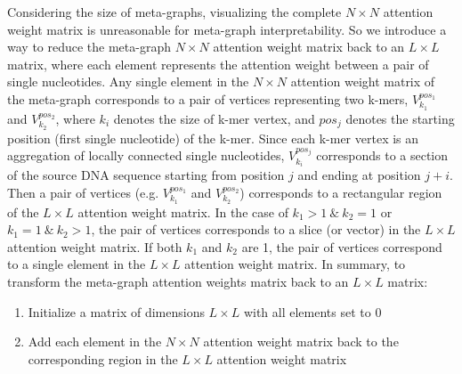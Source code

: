 \documentclass{article}
\begin{document}
Considering the size of meta-graphs, visualizing the complete $N\times N$ attention weight matrix is unreasonable for meta-graph interpretability. So we introduce a way to reduce the meta-graph $N\times N$ attention weight matrix back to an $L\times L$ matrix, where each element represents the attention weight between a pair of single nucleotides. Any single element in the $N\times N$ attention weight matrix of the meta-graph corresponds to a pair of vertices representing two k-mers, $V_{k_1}^{pos_1}$ and $V_{k_2}^{pos_2}$, where $k_i$ denotes the size of k-mer vertex, and $pos_j$ denotes the starting position (first single nucleotide) of the k-mer. Since each k-mer vertex is an aggregation of locally connected single nucleotides, $V_{k_i}^{pos_j}$ corresponds to a section of the source DNA sequence starting from position $j$ and ending at position $j+i$. Then a pair of vertices (e.g. $V_{k_1}^{pos_1}$ and $V_{k_2}^{pos_2}$) corresponds to a rectangular region of the $L\times L$ attention weight matrix. In the case of $k_1 > 1 \ \& \ k_2 = 1$ or $k_1 = 1 \ \& \ k_2 > 1$, the pair of vertices corresponds to a slice (or vector) in the $L\times L$ attention weight matrix. If both $k_1$ and $k_2$ are 1, the pair of vertices correspond to a single element in the $L\times L$ attention weight matrix. In summary, to transform the meta-graph attention weights matrix back to an $L\times L$ matrix:
\begin{enumerate}
\item Initialize a matrix of dimensions $L\times L$ with all elements set to 0
\item Add each element in the $N\times N$ attention weight matrix back to the corresponding region in the $L\times L$ attention weight matrix
\end{enumerate}


\end{document}
